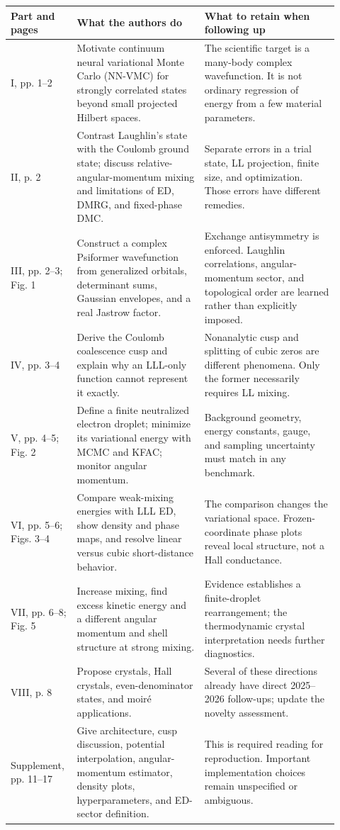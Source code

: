 \documentclass[11pt,letterpaper]{article}
\begin{document}
\begin{longtable}{>{\raggedright\arraybackslash}p{0.16\linewidth}>{\raggedright\arraybackslash}p{0.37\linewidth}>{\raggedright\arraybackslash}p{0.39\linewidth}}
\toprule
Part and pages & What the authors do & What to retain when following up \\
\midrule\endhead
I, pp. 1--2 & Motivate continuum neural variational Monte Carlo (NN-VMC) for strongly correlated states beyond small projected Hilbert spaces. & The scientific target is a many-body complex wavefunction. It is not ordinary regression of energy from a few material parameters. \\
II, p. 2 & Contrast Laughlin's state with the Coulomb ground state; discuss relative-angular-momentum mixing and limitations of ED, DMRG, and fixed-phase DMC. & Separate errors in a trial state, LL projection, finite size, and optimization. Those errors have different remedies. \\
III, pp. 2--3; Fig. 1 & Construct a complex Psiformer wavefunction from generalized orbitals, determinant sums, Gaussian envelopes, and a real Jastrow factor. & Exchange antisymmetry is enforced. Laughlin correlations, angular-momentum sector, and topological order are learned rather than explicitly imposed. \\
IV, pp. 3--4 & Derive the Coulomb coalescence cusp and explain why an LLL-only function cannot represent it exactly. & Nonanalytic cusp and splitting of cubic zeros are different phenomena. Only the former necessarily requires LL mixing. \\
V, pp. 4--5; Fig. 2 & Define a finite neutralized electron droplet; minimize its variational energy with MCMC and KFAC; monitor angular momentum. & Background geometry, energy constants, gauge, and sampling uncertainty must match in any benchmark. \\
VI, pp. 5--6; Figs. 3--4 & Compare weak-mixing energies with LLL ED, show density and phase maps, and resolve linear versus cubic short-distance behavior. & The comparison changes the variational space. Frozen-coordinate phase plots reveal local structure, not a Hall conductance. \\
VII, pp. 6--8; Fig. 5 & Increase mixing, find excess kinetic energy and a different angular momentum and shell structure at strong mixing. & Evidence establishes a finite-droplet rearrangement; the thermodynamic crystal interpretation needs further diagnostics. \\
VIII, p. 8 & Propose crystals, Hall crystals, even-denominator states, and moir\'e applications. & Several of these directions already have direct 2025--2026 follow-ups; update the novelty assessment. \\
Supplement, pp. 11--17 & Give architecture, cusp discussion, potential interpolation, angular-momentum estimator, density plots, hyperparameters, and ED-sector definition. & This is required reading for reproduction. Important implementation choices remain unspecified or ambiguous. \\
\bottomrule
\end{longtable}
\end{document}
